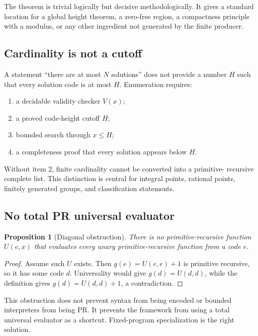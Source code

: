\documentclass[11pt]{article}
\newtheorem{proposition}[theorem]{Proposition}
\begin{document}
The theorem is trivial logically but decisive methodologically.  It gives a
standard location for a global height theorem, a zero-free region, a compactness
principle with a modulus, or any other ingredient not generated by the finite
producer.

\subsection{Cardinality is not a cutoff}

A statement ``there are at most \(N\) solutions'' does not provide a number
\(H\) such that every solution code is at most \(H\).  Enumeration requires:

\begin{enumerate}
\item a decidable validity checker \(V(x)\);
\item a proved code-height cutoff \(H\);
\item bounded search through \(x\le H\);
\item a completeness proof that every solution appears below \(H\).
\end{enumerate}

Without item 2, finite cardinality cannot be converted into a primitive-
recursive complete list.  This distinction is central for integral points,
rational points, finitely generated groups, and classification statements.

\subsection{No total PR universal evaluator}

\begin{proposition}[Diagonal obstruction]
\label{prop:no-universal}
There is no primitive-recursive function \(U(e,x)\) that evaluates every unary
primitive-recursive function from a code \(e\).
\end{proposition}

\begin{proof}
Assume such \(U\) exists.  Then
\(g(e)=U(e,e)+1\) is primitive recursive, so it has some code \(d\).  Universality
would give \(g(d)=U(d,d)\), while the definition gives
\(g(d)=U(d,d)+1\), a contradiction.
\end{proof}

This obstruction does not prevent syntax from being encoded or bounded
interpreters from being PR.  It prevents the framework from using a total
universal evaluator as a shortcut.  Fixed-program specialization is the right
solution.
\end{document}
